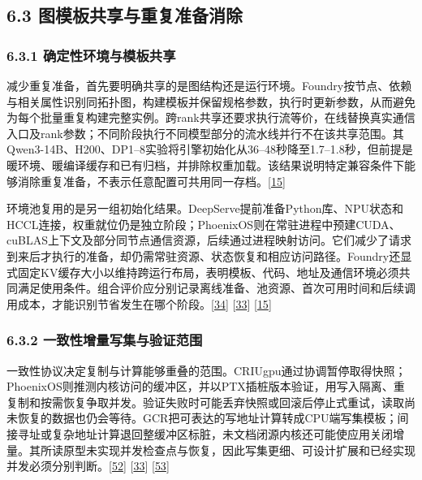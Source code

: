 \documentclass[
  11pt,
  UTF8]{ctexart}
\begin{document}
\hypertarget{section-6-3}{%
\subsection{6.3 图模板共享与重复准备消除}\label{section-6-3}}

\hypertarget{section-6-3-1}{%
\subsubsection{6.3.1 确定性环境与模板共享}\label{section-6-3-1}}

减少重复准备，首先要明确共享的是图结构还是运行环境。Foundry按节点、依赖与相关属性识别同拓扑图，构建模板并保留规格参数，执行时更新参数，从而避免为每个批量重复构建完整实例。跨rank共享还要求执行流等价，在线替换真实通信入口及rank参数；不同阶段执行不同模型部分的流水线并行不在该共享范围。其Qwen3-14B、H200、DP1--8实验将引擎初始化从36--48秒降至1.7--1.8秒，但前提是暖环境、暖编译缓存和已有归档，并排除权重加载。该结果说明特定兼容条件下能够消除重复准备，不表示任意配置可共用同一存档。{[}\protect\hyperlink{ref-liu2026foundry}{15}{]}

环境池复用的是另一组初始化结果。DeepServe提前准备Python库、NPU状态和HCCL连接，权重就位仍是独立阶段；PhoenixOS则在常驻进程中预建CUDA、cuBLAS上下文及部分同节点通信资源，后续通过进程映射访问。它们减少了请求到来后才执行的准备，却仍需常驻资源、状态恢复和相应访问路径。Foundry还显式固定KV缓存大小以维持跨运行布局，表明模板、代码、地址及通信环境必须共同满足使用条件。组合评价应分别记录离线准备、池资源、首次可用时间和后续调用成本，才能识别节省发生在哪个阶段。{[}\protect\hyperlink{ref-hu2025deepserve}{34}{]}
{[}\protect\hyperlink{ref-wei2025phoenixos}{33}{]}
{[}\protect\hyperlink{ref-liu2026foundry}{15}{]}

\hypertarget{section-6-3-2}{%
\subsubsection{6.3.2 一致性增量写集与验证范围}\label{section-6-3-2}}

一致性协议决定复制与计算能够重叠的范围。CRIUgpu通过协调暂停取得快照；PhoenixOS则推测内核访问的缓冲区，并以PTX插桩版本验证，用写入隔离、重复制和按需恢复争取并发。验证失败时可能丢弃快照或回滚后停止式重试，读取尚未恢复的数据也仍会等待。GCR把可表达的写地址计算转成CPU端写集模板；间接寻址或复杂地址计算退回整缓冲区标脏，未文档闭源内核还可能使应用关闭增量。其所读原型未实现并发检查点与恢复，因此写集更细、可设计扩展和已经实现并发必须分别判断。{[}\protect\hyperlink{ref-stoyanov2025criugpu}{52}{]}
{[}\protect\hyperlink{ref-wei2025phoenixos}{33}{]}
{[}\protect\hyperlink{ref-zeng2026gcr}{53}{]}
\end{document}
